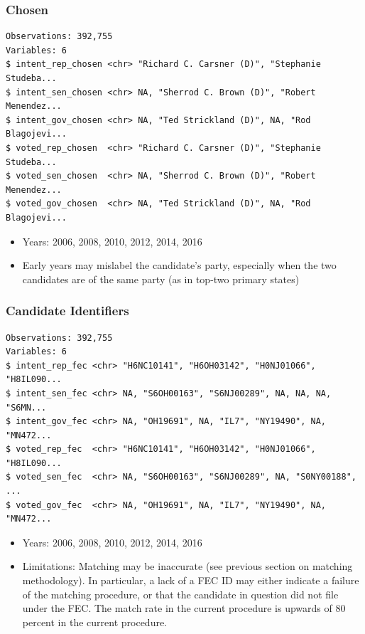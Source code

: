 \documentclass[10pt,article,oneside]{memoir}
\theoremstyle{definition}
\begin{document}
\subsubsection{Chosen}\label{chosen}

\begin{verbatim}
Observations: 392,755
Variables: 6
$ intent_rep_chosen <chr> "Richard C. Carsner (D)", "Stephanie Studeba...
$ intent_sen_chosen <chr> NA, "Sherrod C. Brown (D)", "Robert Menendez...
$ intent_gov_chosen <chr> NA, "Ted Strickland (D)", NA, "Rod Blagojevi...
$ voted_rep_chosen  <chr> "Richard C. Carsner (D)", "Stephanie Studeba...
$ voted_sen_chosen  <chr> NA, "Sherrod C. Brown (D)", "Robert Menendez...
$ voted_gov_chosen  <chr> NA, "Ted Strickland (D)", NA, "Rod Blagojevi...
\end{verbatim}

\begin{itemize}
\tightlist
\item
  Years: 2006, 2008, 2010, 2012, 2014, 2016
\item
  Early years may mislabel the candidate's party, especially when the
  two candidates are of the same party (as in top-two primary states)
\end{itemize}

\subsubsection{Candidate Identifiers}\label{candidate-identifiers}

\begin{verbatim}
Observations: 392,755
Variables: 6
$ intent_rep_fec <chr> "H6NC10141", "H6OH03142", "H0NJ01066", "H8IL090...
$ intent_sen_fec <chr> NA, "S6OH00163", "S6NJ00289", NA, NA, NA, "S6MN...
$ intent_gov_fec <chr> NA, "OH19691", NA, "IL7", "NY19490", NA, "MN472...
$ voted_rep_fec  <chr> "H6NC10141", "H6OH03142", "H0NJ01066", "H8IL090...
$ voted_sen_fec  <chr> NA, "S6OH00163", "S6NJ00289", NA, "S0NY00188", ...
$ voted_gov_fec  <chr> NA, "OH19691", NA, "IL7", "NY19490", NA, "MN472...
\end{verbatim}

\begin{itemize}
\tightlist
\item
  Years: 2006, 2008, 2010, 2012, 2014, 2016
\item
  Limitations: Matching may be inaccurate (see previous section on
  matching methodology). In particular, a lack of a FEC ID may either
  indicate a failure of the matching procedure, or that the candidate in
  question did not file under the FEC. The match rate in the current
  procedure is upwards of 80 percent in the current procedure.
\end{itemize}
\end{document}

